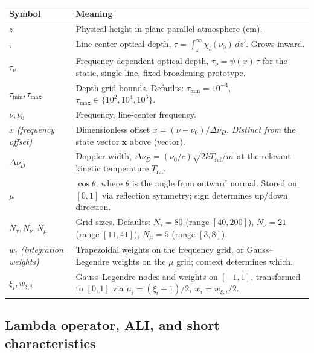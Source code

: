 \documentclass[11pt]{article}
\begin{document}
\noindent\begin{tabular}{@{}p{1.4in}p{4.8in}@{}}
\toprule
\textbf{Symbol} & \textbf{Meaning} \\ \midrule
$z$ & Physical height in plane-parallel atmosphere (cm). \\
$\tau$ & Line-center optical depth, $\tau = \int_z^\infty \chi_l(\nu_0)\, dz'$.  Grows inward. \\
$\tau_\nu$ & Frequency-dependent optical depth, $\tau_\nu = \psi(x)\,\tau$ for the static, single-line, fixed-broadening prototype. \\
$\tau_{\min}, \tau_{\max}$ & Depth grid bounds.  Defaults: $\tau_{\min} = 10^{-4}$, $\tau_{\max} \in \{10^2, 10^4, 10^6\}$. \\
$\nu, \nu_0$ & Frequency, line-center frequency. \\
$x$ \emph{(frequency offset)} & Dimensionless offset $x = (\nu - \nu_0)/\Delta\nu_D$.  \emph{Distinct from} the state vector $\mathbf{x}$ above (vector). \\
$\Delta\nu_D$ & Doppler width, $\Delta\nu_D = (\nu_0/c)\sqrt{2 k T_{\text{ref}}/m}$ at the relevant kinetic temperature $T_{\text{ref}}$. \\
$\mu$ & $\cos\theta$, where $\theta$ is the angle from outward normal.  Stored on $[0, 1]$ via reflection symmetry; sign determines up/down direction. \\
$N_\tau, N_\nu, N_\mu$ & Grid sizes.  Defaults: $N_\tau = 80$ (range $[40, 200]$), $N_\nu = 21$ (range $[11, 41]$), $N_\mu = 5$ (range $[3, 8]$). \\
$w_i$ \emph{(integration weights)} & Trapezoidal weights on the frequency grid, or Gauss--Legendre weights on the $\mu$ grid; context determines which. \\
$\xi_i, w_{\xi,i}$ & Gauss--Legendre nodes and weights on $[-1, 1]$, transformed to $[0, 1]$ via $\mu_i = (\xi_i+1)/2$, $w_i = w_{\xi,i}/2$. \\
\bottomrule
\end{tabular}

\subsection*{Lambda operator, ALI, and short characteristics}
\end{document}
